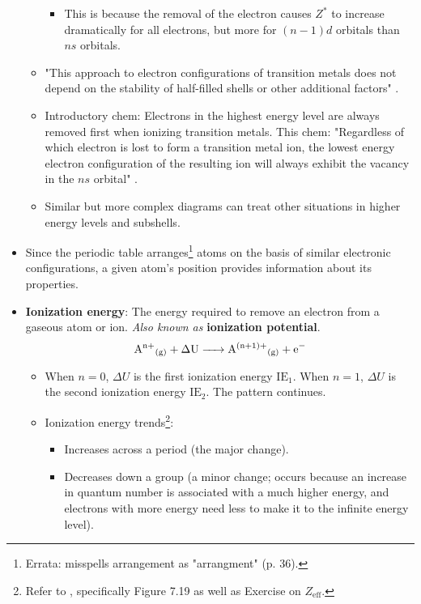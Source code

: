 \documentclass[../main.tex]{subfiles}
\begin{document}
\begin{itemize}
\begin{itemize}
\begin{itemize}
            \item This is because the removal of the electron causes $Z^*$ to increase dramatically for all electrons, but more for $(n-1)d$ orbitals than $ns$ orbitals.
        \end{itemize}
        \item "This approach to electron configurations of transition metals does not depend on the stability of half-filled shells or other additional factors" \parencite[36]{bib:MiesslerFischerTarr}.
        \item Introductory chem: Electrons in the highest energy level are always removed first when ionizing transition metals. This chem: "Regardless of which electron is lost to form a transition metal ion, the lowest energy electron configuration of the resulting ion will always exhibit the vacancy in the $ns$ orbital" \parencite[36]{bib:MiesslerFischerTarr}.
        \item Similar but more complex diagrams can treat other situations in higher energy levels and subshells.
    \end{itemize}
    \item Since the periodic table arranges\footnote{Errata: \textcite{bib:MiesslerFischerTarr} misspells arrangement as "arrangment" (p. 36).} atoms on the basis of similar electronic configurations, a given atom's position provides information about its properties.
    \item \textbf{Ionization energy}: The energy required to remove an electron from a gaseous atom or ion. \emph{Also known as} \textbf{ionization potential}.
    \begin{equation*}
        \ce{{A^{n+}}_{(g)} + \Delta U -> {A^{(n+1)+}}_{(g)} + e-}
    \end{equation*}
    \begin{itemize}
        \item When $n=0$, $\Delta U$ is the first ionization energy $\text{IE}_1$. When $n=1$, $\Delta U$ is the second ionization energy $\text{IE}_2$. The pattern continues.
        \item Ionization energy trends\footnote{Refer to \textcite{bib:APChemNotes}, specifically Figure 7.19 as well as Exercise on $Z_\text{eff}$.}:
        \begin{itemize}
            \item Increases across a period (the major change).
            \item Decreases down a group (a minor change; occurs because an increase in quantum number is associated with a much higher energy, and electrons with more energy need less to make it to the infinite energy level).

\end{itemize}
\end{itemize}
\end{itemize}
\end{document}
